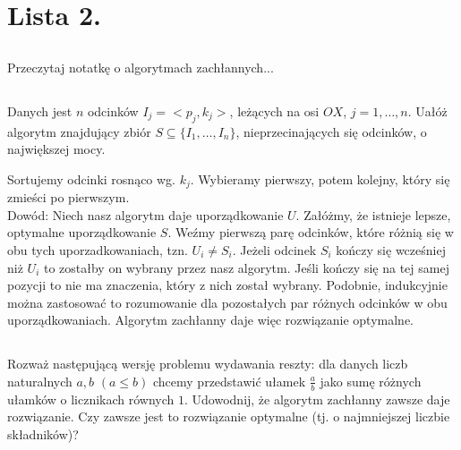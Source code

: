 \documentclass[svgnames]{report}
\begin{document}
%

%


\chapter{Lista 2.}
\section{}
\begin{framed}
Przeczytaj notatkę o algorytmach zachłannych...
\end{framed}
\section{}
\begin{framed}
Danych jest $n$ odcinków $I_j = <p_j,k_j>$, leżących na osi $OX$, $j = 1,\dots,n$. Uałóż algorytm
znajdujący zbiór $S \subseteq \{ I_1,\dots,I_n \}$, nieprzecinających się odcinków, o największej mocy.
\end{framed}

Sortujemy odcinki rosnąco wg. $k_j$. Wybieramy pierwszy, potem kolejny, który się zmieści po pierwszym.\\

\noindent Dowód: Niech nasz algorytm daje uporządkowanie $U$. Załóżmy, że istnieje lepsze, optymalne uporządkowanie $S$. Weźmy pierwszą parę odcinków, które różnią się w obu tych uporzadkowaniach, tzn. $U_i \ne S_i$. Jeżeli odcinek $S_i$ kończy się wcześniej niż $U_i$ to zostałby on wybrany przez nasz algorytm. Jeśli kończy się na tej samej pozycji to nie ma znaczenia, który z nich został wybrany. Podobnie, indukcyjnie można zastosować to rozumowanie dla pozostałych par różnych odcinków w obu uporządkowaniach. Algorytm zachłanny daje więc rozwiązanie optymalne.


\section{}
\begin{framed}
Rozważ następującą wersję problemu wydawania reszty: dla danych liczb naturalnych
$a, b$ $(a \leq b)$ chcemy przedstawić ułamek $\frac{a}{b}$ jako sumę różnych ułamków o licznikach równych
$1$. Udowodnij, że algorytm zachłanny zawsze daje rozwiązanie. Czy zawsze jest to rozwiązanie optymalne (tj. o najmniejszej liczbie składników)?
\end{framed}
\end{document}
